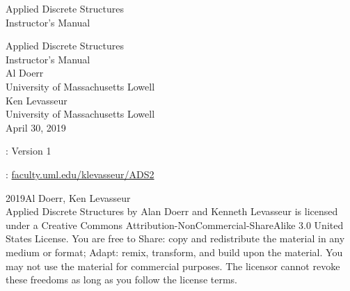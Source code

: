 \documentclass[oneside,10pt,]{book}
\begin{document}
\frontmatter
\thispagestyle{empty}
{\centering
\vspace*{0.28\textheight}
{\Huge Applied Discrete Structures}\\[2\baselineskip]
{\LARGE Instructor's Manual}\\
}
\clearpage
\thispagestyle{empty}
\null%
\clearpage
\thispagestyle{empty}
{\centering
\vspace*{0.14\textheight}
{\Huge Applied Discrete Structures}\\[\baselineskip]
{\LARGE Instructor's Manual}\\[3\baselineskip]
{\Large Al Doerr}\\[0.5\baselineskip]
{\Large University of Massachusetts Lowell}\\[3\baselineskip]
{\Large Ken Levasseur}\\[0.5\baselineskip]
{\Large University of Massachusetts Lowell}\\[3\baselineskip]
{\Large April 30, 2019}\\}
\clearpage
\thispagestyle{empty}
\hypertarget{colophon-1}{}
: Version 1\par\medskip
{}: \href{http:\slash{}\slash{}faculty.uml.edu\slash{}klevasseur\slash{}ADS2}{faculty.uml.edu\slash{}klevasseur\slash{}ADS2}\par\medskip
\noindent\textcopyright{}2019\quad{}Al Doerr, Ken Levasseur\\[0.5\baselineskip]
Applied Discrete Structures by Alan Doerr and Kenneth Levasseur is licensed under a Creative Commons Attribution-NonCommercial-ShareAlike 3.0 United States License. You are free to Share: copy and redistribute the material in any medium or format; Adapt: remix, transform, and build upon the material. You may not use the material for commercial purposes.  The licensor cannot revoke these freedoms as long as you follow the license terms.\par\medskip
{}
\null\clearpage
%
%
\typeout{************************************************}
\typeout{************************************************}
\end{document}
